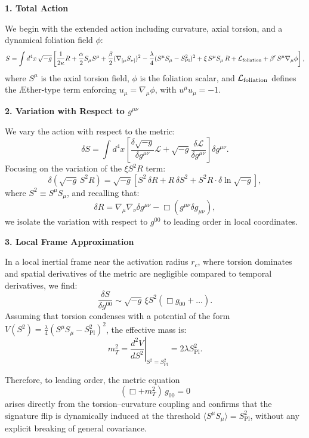 \documentclass{article}
\newcommand{\Splanck}{S_{\mathrm{Pl}}}
\begin{document}
\vspace{1em}
\noindent \textbf{1. Total Action}

We begin with the extended action including curvature, axial torsion, and a dynamical foliation field $\phi$:
\begin{equation}
S = \int d^4x\, \sqrt{-g} \left[
\frac{1}{2\kappa} R
+ \frac{\alpha}{2} S_\mu S^\mu
+ \frac{\beta}{2} (\nabla_{[\mu} S_{\nu]})^2
- \frac{\lambda}{4}(S^\mu S_\mu - \Splanck^2)^2
+ \xi\, S^\mu S_\mu\, R
+ \mathcal{L}_{\rm foliation}
+ \beta'\, S^\mu \nabla_\mu \phi
\right],
\end{equation}
where $S^\mu$ is the axial torsion field, $\phi$ is the foliation scalar, and $\mathcal{L}_{\rm foliation}$ defines the Æther-type term enforcing $u_\mu = \nabla_\mu \phi$, with $u^\mu u_\mu = -1$.

\vspace{1em}
\noindent \textbf{2. Variation with Respect to \boldmath$g^{\mu\nu}$}

We vary the action with respect to the metric:
\begin{equation}
\delta S = \int d^4x \left[ \frac{\delta \sqrt{-g}}{\delta g^{\mu\nu}} \mathcal{L} + \sqrt{-g} \frac{\delta \mathcal{L}}{\delta g^{\mu\nu}} \right] \delta g^{\mu\nu}.
\end{equation}
Focusing on the variation of the $\xi S^2 R$ term:
\[
\delta (\sqrt{-g} \, S^2 R) = \sqrt{-g} \left[ S^2 \, \delta R + R \, \delta S^2 + S^2 R \cdot \delta \ln \sqrt{-g} \right],
\]
where $S^2 \equiv S^\mu S_\mu$, and recalling that:
\[
\delta R = \nabla_\mu \nabla_\nu \delta g^{\mu\nu} - \Box (g^{\mu\nu} \delta g_{\mu\nu}),
\]
we isolate the variation with respect to $g^{00}$ to leading order in local coordinates.

\vspace{1em}
\noindent \textbf{3. Local Frame Approximation}

In a local inertial frame near the activation radius $r_c$, where torsion dominates and spatial derivatives of the metric are negligible compared to temporal derivatives, we find:
\[
\frac{\delta S}{\delta g^{00}} \sim \sqrt{-g} \, \xi S^2 \left( \Box g_{00} + \ldots \right).
\]
Assuming that torsion condenses with a potential of the form $V(S^2) = \frac{\lambda}{4}(S^\mu S_\mu - \Splanck^2)^2$, the effective mass is:
\[
m_T^2 = \left. \frac{d^2 V}{d S^2} \right|_{S^2 = \Splanck^2} = 2\lambda \Splanck^2.
\]

Therefore, to leading order, the metric equation
\[
(\Box + m_T^2)\, g_{00} = 0
\]
arises directly from the torsion–curvature coupling and confirms that the signature flip is dynamically induced at the threshold $\langle S^\mu S_\mu \rangle = \Splanck^2$, without any explicit breaking of general covariance.
\end{document}
